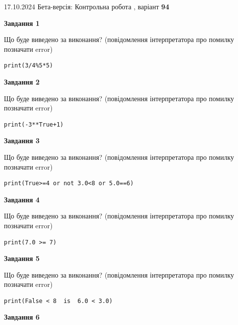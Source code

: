 \documentclass[12pt, ukrainian]{article}
\begin{document}
{\Large{17.10.2024 Бета-версія: Контрольна робота , варіант  \No \textbf { 94 }\par}}
{
\begin {large}
{\begin {center}\textbf{Завдання 1}\end {center}}

Що буде виведено за виконання? (повідомлення інтерпретатора про помилку позначати error)\par
\begin{verbatim}
print(3/4%5*5)
\end{verbatim}

{\begin {center}\textbf{Завдання 2}\end {center}}

Що буде виведено за виконання? (повідомлення інтерпретатора про помилку позначати error)\par
\begin{verbatim}
print(-3**True+1)
\end{verbatim}

{\begin {center}\textbf{Завдання 3}\end {center}}

Що буде виведено за виконання? (повідомлення інтерпретатора про помилку позначати error)\par
\begin{verbatim}
print(True>=4 or not 3.0<8 or 5.0==6)
\end{verbatim}

{\begin {center}\textbf{Завдання 4}\end {center}}

Що буде виведено за виконання? (повідомлення інтерпретатора про помилку позначати error)\par
\begin{verbatim}
print(7.0 >= 7)
\end{verbatim}

{\begin {center}\textbf{Завдання 5}\end {center}}

Що буде виведено за виконання? (повідомлення інтерпретатора про помилку позначати error)\par
\begin{verbatim}
print(False < 8  is  6.0 < 3.0)
\end{verbatim}

{\begin {center}\textbf{Завдання 6}\end {center}}


\end{large}}
\end{document}
